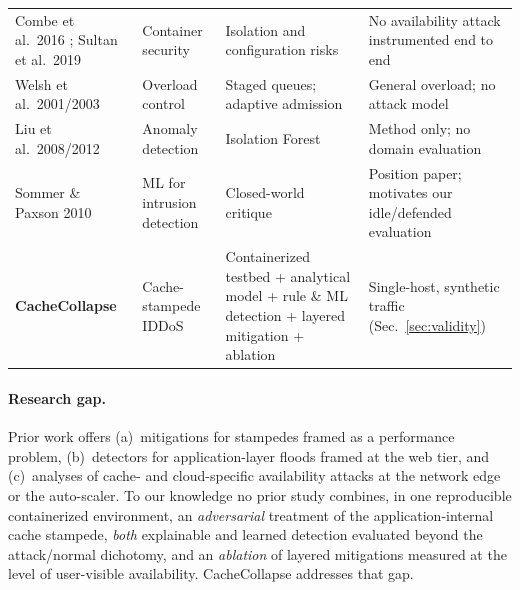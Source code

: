\begin{table}[p]
\begin{tabularx}{\linewidth}{@{}L{2.7cm}L{2.6cm}YY@{}}
Combe et al.\ 2016 \cite{combe2016}; Sultan et al.\ 2019 \cite{sultan2019} & Container security & Isolation and configuration risks & No availability attack instrumented end to end \\
Welsh et al.\ 2001/2003 \cite{welsh2001,welsh2003} & Overload control & Staged queues; adaptive admission & General overload; no attack model \\
Liu et al.\ 2008/2012 \cite{liu2008,liu2012} & Anomaly detection & Isolation Forest & Method only; no domain evaluation \\
Sommer \& Paxson 2010 \cite{sommer2010} & ML for intrusion detection & Closed-world critique & Position paper; motivates our idle/defended evaluation \\
\midrule
\textbf{CacheCollapse} & Cache-stampede IDDoS & Containerized testbed + analytical model + rule \& ML detection + layered mitigation + ablation & Single-host, synthetic traffic (Sec.~\ref{sec:validity}) \\
\bottomrule
\end{tabularx}
\end{table}

\paragraph{Research gap.} Prior work offers (a)~mitigations for stampedes framed as a
performance problem, (b)~detectors for application-layer floods framed at the web
tier, and (c)~analyses of cache- and cloud-specific availability attacks at the network
edge or the auto-scaler. To our knowledge no prior study combines, in one reproducible
containerized environment, an \emph{adversarial} treatment of the application-internal
cache stampede, \emph{both} explainable and learned detection evaluated beyond the
attack/normal dichotomy, and an \emph{ablation} of layered mitigations measured at the
level of user-visible availability. CacheCollapse addresses that gap.
